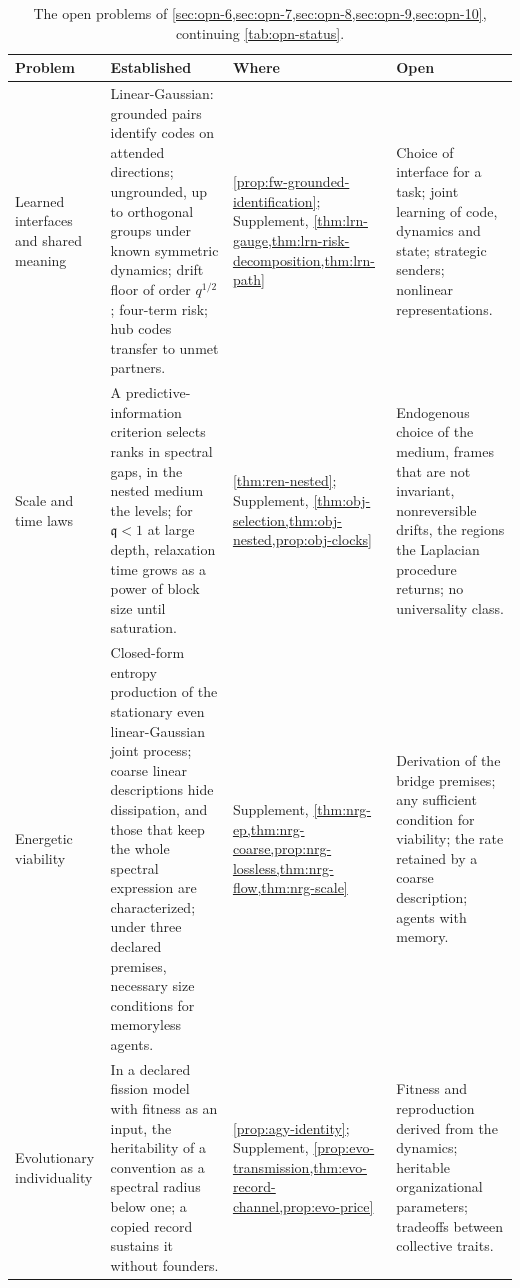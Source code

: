\begin{table}[p]
\centering
\small
\caption{The open problems of \cref{sec:opn-6,sec:opn-7,sec:opn-8,sec:opn-9,sec:opn-10}, continuing \cref{tab:opn-status}.}
\label{tab:opn-status-b}
\begin{tabular}{@{}>{\raggedright\arraybackslash}p{}>{\raggedright\arraybackslash}p{}>{\raggedright\arraybackslash}p{}>{\raggedright\arraybackslash}p{}@{}}
\toprule
Problem & Established & Where & Open \\
\midrule
Learned interfaces and shared meaning & Linear-Gaussian: grounded pairs identify codes on attended directions; ungrounded, up to orthogonal groups under known symmetric dynamics; drift floor of order $q^{1/2}$; four-term risk; hub codes transfer to unmet partners. & \cref{prop:fw-grounded-identification}; Supplement, \cref{thm:lrn-gauge,thm:lrn-risk-decomposition,thm:lrn-path} & Choice of interface for a task; joint learning of code, dynamics and state; strategic senders; nonlinear representations. \\
\addlinespace
Scale and time laws & A predictive-information criterion selects ranks in spectral gaps, in the nested medium the levels; for $\mathfrak{q}<1$ at large depth, relaxation time grows as a power of block size until saturation. & \cref{thm:ren-nested}; Supplement, \cref{thm:obj-selection,thm:obj-nested,prop:obj-clocks} & Endogenous choice of the medium, frames that are not invariant, nonreversible drifts, the regions the Laplacian procedure returns; no universality class. \\
\addlinespace
Energetic viability & Closed-form entropy production of the stationary even linear-Gaussian joint process; coarse linear descriptions hide dissipation, and those that keep the whole spectral expression are characterized; under three declared premises, necessary size conditions for memoryless agents. & Supplement, \cref{thm:nrg-ep,thm:nrg-coarse,prop:nrg-lossless,thm:nrg-flow,thm:nrg-scale} & Derivation of the bridge premises; any sufficient condition for viability; the rate retained by a coarse description; agents with memory. \\
\addlinespace
Evolutionary individuality & In a declared fission model with fitness as an input, the heritability of a convention as a spectral radius below one; a copied record sustains it without founders. & \cref{prop:agy-identity}; Supplement, \cref{prop:evo-transmission,thm:evo-record-channel,prop:evo-price} & Fitness and reproduction derived from the dynamics; heritable organizational parameters; tradeoffs between collective traits. \\

\end{tabular}
\end{table}
